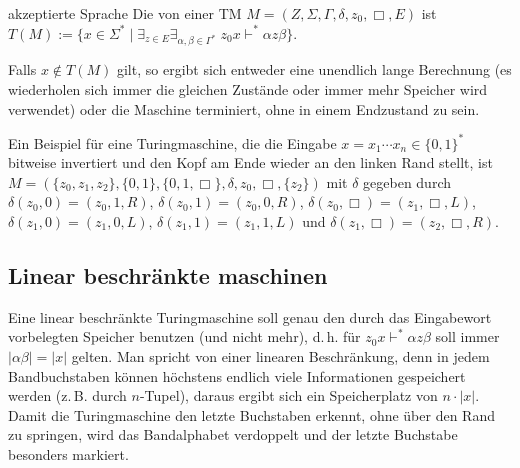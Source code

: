 \begin{Def}{akzeptierte Sprache}
    Die von einer TM $M = (Z, \Sigma, \Gamma, \delta, z_0, \Box, E)$
     ist
    $T(M) := \{x \in \Sigma^\ast \;|\;
    \exists_{z \in E} \exists_{\alpha, \beta \in \Gamma^\ast}\;
    z_0 x \vdash^\ast \alpha z \beta\}$.
\end{Def}

\begin{Bem}
    Falls $x \notin T(M)$ gilt, so ergibt sich entweder eine unendlich lange
    Berechnung (es wiederholen sich immer die gleichen Zustände oder immer
    mehr Speicher wird verwendet) oder die Maschine terminiert, ohne in einem
    Endzustand zu sein.
\end{Bem}

\linie

\begin{Bsp}
    Ein Beispiel für eine Turingmaschine, die die Eingabe
    $x = x_1 \dotsb x_n \in \{0, 1\}^\ast$ bitweise invertiert und den Kopf
    am Ende wieder an den linken Rand stellt, ist\\
    $M = (\{z_0, z_1, z_2\}, \{0, 1\}, \{0, 1, \Box\}, \delta, z_0, \Box,
    \{z_2\})$ mit $\delta$ gegeben durch\\
    $\delta(z_0, 0) = (z_0, 1, R)$,
    $\delta(z_0, 1) = (z_0, 0, R)$,
    $\delta(z_0, \Box) = (z_1, \Box, L)$,\\
    $\delta(z_1, 0) = (z_1, 0, L)$,
    $\delta(z_1, 1) = (z_1, 1, L)$ und
    $\delta(z_1, \Box) = (z_2, \Box, R)$.
\end{Bsp}

\pagebreak

\subsection{%
    Linear beschränkte maschinen%
}

\begin{Bem}
    Eine linear beschränkte Turingmaschine soll genau den durch das Eingabewort
    vorbelegten Speicher benutzen (und nicht mehr), d.\,h.
    für $z_0 x \vdash^\ast \alpha z \beta$ soll immer $|\alpha \beta| = |x|$
    gelten.
    Man spricht von einer linearen Beschränkung, denn in jedem Bandbuchstaben
    können höchstens endlich viele Informationen gespeichert werden
    (z.\,B. durch $n$-Tupel), daraus ergibt sich ein Speicherplatz von
    $n \cdot |x|$.
    Damit die Turingmaschine den letzte Buchstaben erkennt, ohne über den
    Rand zu springen, wird das Bandalphabet verdoppelt und der letzte Buchstabe
    besonders markiert.
\end{Bem}

